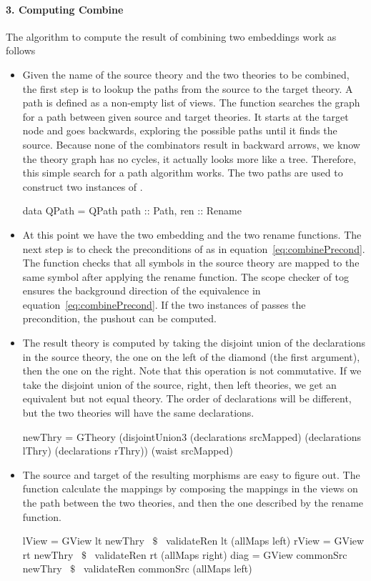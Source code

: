 \paragraph{3. Computing Combine}
The algorithm to compute the result of combining two embeddings work as follows 
\begin{itemize}
    \item Given the name of the source theory and the two theories to be combined, the first step is to lookup the paths from the source to the target theory. A path is defined as a non-empty list of views. The function  searches the graph for a path between given source and target theories. It starts at the target node and goes backwards, exploring the possible paths until it finds the source. Because none of the combinators result in backward arrows, we know the theory graph has no cycles, it actually looks more like a tree. Therefore, this simple search for a path algorithm works. The two paths are used to construct two instances of . 
\begin{hscode}
data QPath = QPath { 
  path :: Path,
  ren  :: Rename }
\end{hscode}

    \item At this point we have the two embedding and the two rename functions. The next step is to check the preconditions of  as in equation~\ref{eq:combinePrecond}. The function  checks that all symbols in the source theory are mapped to the same symbol after applying the rename function. The scope checker of tog ensures the background direction of the equivalence in equation~\ref{eq:combinePrecond}. If the two instances of  passes the precondition, the pushout can be computed.
    
    \item The result theory is computed by taking the disjoint union of the declarations in the source theory, the one on the left of the diamond (the first argument), then the one on the right. Note that this operation is not commutative. If we take the disjoint union of the source, right, then left theories, we get an equivalent but not equal theory. The order of declarations will be different, but the two theories will have the same declarations. 
\begin{hscode}
 newThry = 
   GTheory (disjointUnion3 (declarations srcMapped)
                           (declarations lThry) 
                           (declarations rThry)) 
           (waist srcMapped)
\end{hscode}    
    \item The source and target of the resulting morphisms are easy to figure out. The function  calculate the mappings by composing the mappings in the views on the path between the two theories, and then the one described by the rename function. 
\begin{hscode}
lView = GView lt newThry ~$\$$~ validateRen lt (allMaps left)
rView = GView rt newThry ~$\$$~ validateRen rt (allMaps right)
diag  = GView commonSrc newThry ~$\$$~ validateRen commonSrc (allMaps left)
\end{hscode}
\end{itemize}

